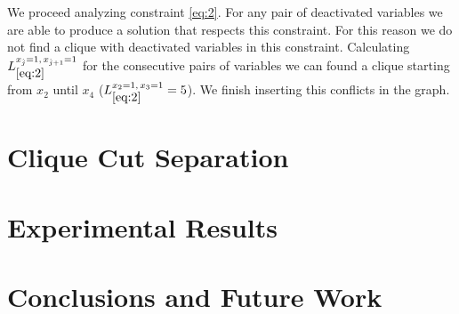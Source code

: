 \documentclass{endm}
\begin{document}
\begin{example}
We proceed analyzing constraint \ref{eq:2}. For any pair of deactivated variables we are able to produce a solution that respects this constraint. For this reason we do not find a clique with deactivated variables in this constraint. Calculating $L_{\ref{eq:2}}^{x_{\hat{j}}=1,\, x_{\hat{j}+1}=1}$ for the consecutive pairs of variables we can found a clique starting from $x_2$ until $x_4$ ($L_{\ref{eq:2}}^{x_{2}=1,\, x_{3}=1} = 5$). We finish inserting this conflicts in the graph.

\end{example}


\section{Clique Cut Separation}\label{cut}
\section{Experimental Results}\label{experiments}
\section{Conclusions and Future Work}\label{conclusions}



\end{document}
